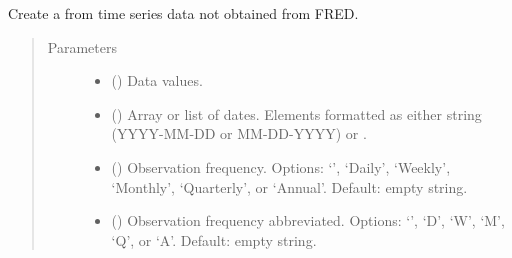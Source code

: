 \documentclass[letterpaper,10pt,openany,oneside,english]{sphinxmanual}
\begin{document}
\begin{fulllineitems}
\label{\detokenize{additional_functions:fredpy.toFredSeries}}
Create a {\hyperref[\detokenize{series_class:fredpy.series}]{}} from time series data not obtained from FRED.
\begin{quote}\begin{description}
\item[{Parameters}] \leavevmode\begin{itemize}
\item {} 
 (\sphinxstyleliteralemphasis{\sphinxupquote{, }}) \textendash{} Data values.

\item {} 
 () \textendash{} Array or list of dates. Elements formatted as either string (YYYY-MM-DD or MM-DD-YYYY) or .

\item {} 
 () \textendash{} Observation frequency. Options: ‘’, ‘Daily’, ‘Weekly’, ‘Monthly’, ‘Quarterly’, or ‘Annual’. Default: empty string.

\item {} 
 () \textendash{} Observation frequency abbreviated. Options: ‘’, ‘D’, ‘W’, ‘M’, ‘Q’, or ‘A’. Default: empty string.


\end{itemize}
\end{description}
\end{quote}
\end{fulllineitems}
\end{document}
